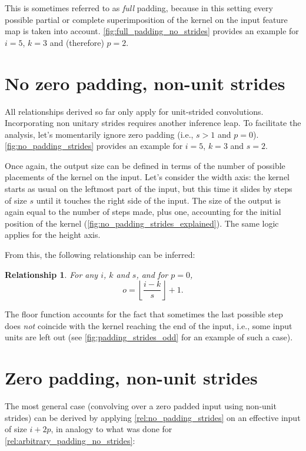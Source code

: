 \documentclass[notitlepage]{report}
\newtheorem{relationship}{Relationship}
\begin{document}
\noindent This is sometimes referred to as {\em full\/} padding, because in this
setting every possible partial or complete superimposition of the kernel on the
input feature map is taken into account. \autoref{fig:full_padding_no_strides}
provides an example for $i = 5$, $k = 3$ and (therefore) $p = 2$.

\section{No zero padding, non-unit strides}

All relationships derived so far only apply for unit-strided convolutions.
Incorporating non unitary strides requires another inference leap. To
facilitate the analysis, let's momentarily ignore zero padding (i.e., $s > 1$
and $p = 0$). \autoref{fig:no_padding_strides} provides an example for $i =
5$, $k = 3$ and $s = 2$.

Once again, the output size can be defined in terms of the number of possible
placements of the kernel on the input. Let's consider the width axis: the
kernel starts as usual on the leftmost part of the input, but this time it
slides by steps of size $s$ until it touches the right side of the input. The
size of the output is again equal to the number of steps made, plus one,
accounting for the initial position of the kernel
(\autoref{fig:no_padding_strides_explained}). The same logic applies for the
height axis.

From this, the following relationship can be inferred:

\begin{relationship}\label{rel:no_padding_strides}
For any $i$, $k$ and $s$, and for $p = 0$,
\begin{equation*}
    o = \left\lfloor \frac{i - k}{s} \right\rfloor + 1.
\end{equation*}
\end{relationship}

\noindent The floor function accounts for the fact that sometimes the last
possible step does {\em not\/} coincide with the kernel reaching the end of the
input, i.e., some input units are left out (see
\autoref{fig:padding_strides_odd} for an example of such a case).

\section{Zero padding, non-unit strides}

The most general case (convolving over a zero padded input using non-unit
strides) can be derived by applying \autoref{rel:no_padding_strides} on an
effective input of size $i + 2p$, in analogy to what was done for
\autoref{rel:arbitrary_padding_no_strides}:
\end{document}
